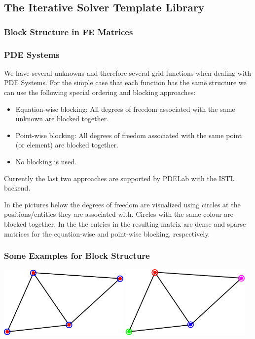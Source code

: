 {\subsection{The Iterative Solver Template Library}
\label{sec:iter-solv-templ}

\subsubsection{Block Structure in FE Matrices}
\label{sec:motivation}
\begin{frame} \frametitle{PDE Systems}
  \begin{block}{}
      We have several unknowns and therefore several grid functions
      when dealing with PDE Systems.
      For the simple case that each function has the same structure we
      can use the following special ordering and blocking approaches:
  \begin{itemize}
  \item Equation-wise blocking: All degrees of freedom associated with
    the same unknown are blocked together.
  \item Point-wise blocking: All degrees of freedom associated with
    the same point (or element) are blocked together.
  \item No blocking is used.
  \end{itemize}
  \end{block}
  Currently the last two approaches are supported by PDELab with the
  ISTL backend.
\end{frame}
In the pictures below the degrees of freedom are visualized using
circles at the positions/entities they are associated with. Circles
with the same colour are blocked together. In the the entries in the
resulting matrix are dense and sparse matrices for the equation-wise
and point-wise blocking, respectively.
\begin{frame}
\frametitle{Some Examples for Block Structure}
\begin{block}{}
\includegraphics[width=0.48\textwidth]{./EPS/P1P1}\hfill
\includegraphics[width=0.48\textwidth]{./EPS/P1P1b}


\end{block}
\end{frame}}
